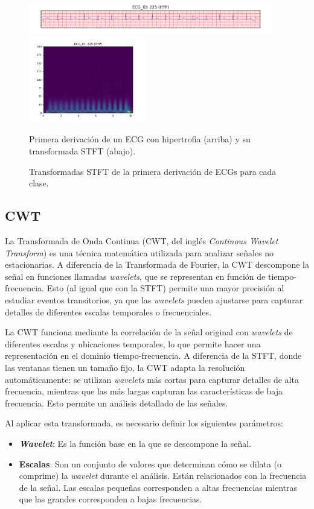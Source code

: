 \begin{figure}[t]\ContinuedFloat
	\centering
	\includegraphics[width=0.95\textwidth]{Imagenes/Vectorial/Transformadas/HYP/ecg.png}
	\includegraphics[width=0.45\textwidth]{Imagenes/Vectorial/Transformadas/HYP/stft.png}
	\par Primera derivación de un ECG con hipertrofia (arriba) y su transformada STFT (abajo).
	\caption{Transformadas STFT de la primera derivación de ECGs para cada clase.}
\end{figure}

\subsection{CWT}
\label{subsec:cwt}
La Transformada de Onda Continua (CWT, del inglés \emph{Continous Wavelet Transform}) es una técnica matemática utilizada para analizar señales no estacionarias. A diferencia de la Transformada de Fourier, la CWT descompone la señal en funciones llamadas \emph{wavelets}, que se representan en función de tiempo-frecuencia. Esto (al igual que con la STFT) permite una mayor precisión al estudiar eventos transitorios, ya que las \emph{wavelets} pueden ajustarse para capturar detalles de diferentes escalas temporales o frecuenciales.

La CWT funciona mediante la correlación de la señal original con \emph{wavelets} de diferentes escalas y ubicaciones temporales, lo que permite hacer una representación en el dominio tiempo-frecuencia. A diferencia de la STFT, donde las ventanas tienen un tamaño fijo, la CWT adapta la resolución automáticamente: se utilizan \emph{wavelets} más cortas para capturar detalles de alta frecuencia, mientras que las más largas capturan las características de baja frecuencia. Esto permite un análisis detallado de las señales.

Al aplicar esta transformada, es necesario definir los siguientes parámetros:
\begin{itemize}
	\item \textbf{\emph{Wavelet}}: Es la función base en la que se descompone la señal.
	\item \textbf{Escalas}: Son un conjunto de valores que determinan cómo se dilata (o comprime) la \emph{wavelet} durante el análisis. Están relacionados con la frecuencia de la señal. Las escalas pequeñas corresponden a altas frecuencias mientras que las grandes corresponden a bajas frecuencias.
\end{itemize}


